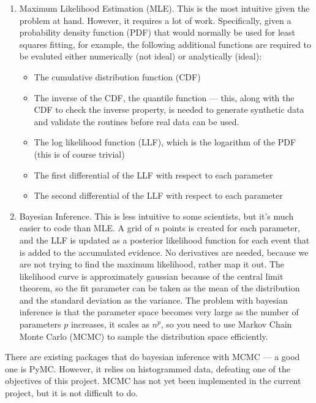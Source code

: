 \documentclass{article}
\begin{document}
\begin{enumerate}

\item Maximum Likelihood Estimation (MLE).  This is the most intuitive
  given the problem at hand.  However, it requires a lot of work.  Specifically, given a probability density function (PDF) that would normally be used for least squares fitting, for example, the following additional functions are required to be evaluted either numerically (not ideal) or analytically (ideal):
  \begin{itemize}
  \item The cumulative distribution function (CDF)
  \item The inverse of the CDF, the quantile function --- this, along
    with the CDF to check the inverse property, is needed to generate
    synthetic data and validate the routines before real data can be
    used.
  \item The log likelihood function (LLF), which is the logarithm of
    the PDF (this is of course trivial)
  \item The first differential of the LLF with respect to each parameter
  \item The second differential of the LLF with respect to each parameter
  \end{itemize}

\item Bayesian Inference.  This is less intuitive to some scientists,
  but it's much easier to code than MLE.  A grid of $n$ points is
  created for each parameter, and the LLF is updated as a posterior
  likelihood function for each event that is added to the accumulated
  evidence.  No derivatives are needed, because we are not trying to
  find the maximum likelihood, rather map it out.  The likelihood
  curve is approximately gaussian because of the central limit
  theorem, so the fit parameter can be taken as the mean of the
  distribution and the standard deviation as the variance.  The
  problem with bayesian inference is that the parameter space becomes
  very large as the number of parameters $p$ increases, it scales as
  $n^p$, so you need to use Markov Chain Monte Carlo (MCMC) to sample
  the distribution space efficiently.
\end{enumerate}

There are existing packages that do bayesian inference with MCMC --- a
good one is PyMC.  However, it relies on histogrammed data, defeating
one of the objectives of this project.  MCMC has not yet been
implemented in the current project, but it is not difficult to do.
\end{document}
